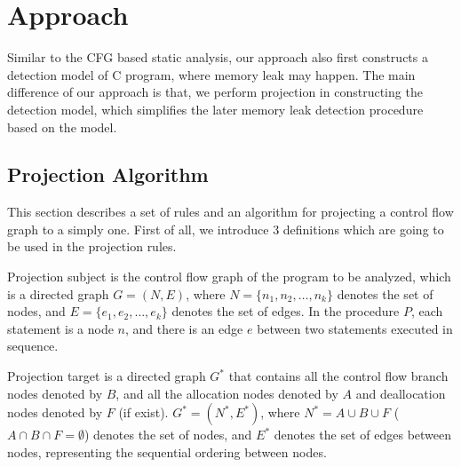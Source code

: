 \section{Approach}\label{sec:approach}
Similar to the CFG based static analysis, our approach also first constructs a detection model of C program, where memory leak may happen. The main difference of our approach is that, we perform projection in constructing the detection model, which simplifies the later memory leak detection procedure based on the model.

\subsection{Projection Algorithm}

This section describes a set of rules and an algorithm for projecting a control flow graph to a simply one. First of all, we introduce $3$ definitions which are going to be used in the projection rules.

\begin{definition}
Projection subject is the control flow graph of the program to be analyzed, which is a directed graph $G=(N, E)$, where $N = \{n_1, n_2, \ldots, n_k\}$ denotes the set of nodes, and $E = \{e_1, e_2, \ldots, e_k\}$ denotes the set of edges. In the procedure $P$, each statement is a node $n$, and there is an edge $e$ between two statements executed in sequence. 
\end{definition}

\begin{definition}
Projection target is a directed graph $G^*$ that contains all the control flow branch nodes denoted by $B$, and all the allocation nodes denoted by $A$ and deallocation nodes denoted by $F$ (if exist). $G^* = (N^*, E^*)$, where $N^* = A\cup B\cup F$ ($A\cap B\cap F=\emptyset$) denotes the set of nodes, and $E^*$ denotes the set of edges between nodes, representing the sequential ordering between nodes.
\end{definition}

